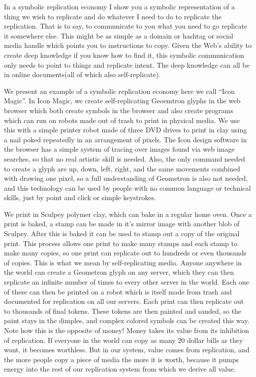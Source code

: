 In a symbolic replication economy I show you a symbolic representation
of a thing we wish to replicate and do whatever I need to do to
replicate the replication. That is to say, to communicate to you what
you need to go replicate it somewhere else. This might be as simple as a
domain or hashtag or social media handle which points you to
instructions to copy. Given the Web's ability to create deep knowledge
if you know how to find it, this symbolic communication only needs to
point to things and replicate intent. The deep knowledge can all be in
online documents(all of which also self-replicate).

We present an example of a symbolic replication economy here we call
``Icon Magic''. In Icon Magic, we create self-replicating Geoemtron
glyphs in the web browser which both create symbols in the browser and
also create programs which can run on robots made out of trash to print
in physical media. We use this with a simple printer robot made of three
DVD drives to print in clay using a nail poked repeatedly in an
arrangement of pixels. The Icon design software in the browser has a
simple system of tracing over images found via web image searches, so
that no real artistic skill is needed. Also, the only command needed to
create a glyph are up, down, left, right, and the same movements
combined with drawing one pixel, so a full understanding of Geometron is
also not needed, and this technology can be used by people with no
common language or technical skills, just by point and click or simple
keystrokes.

We print in Sculpey polymer clay, which can bake in a regular home oven.
Once a print is baked, a stamp can be made in it's mirror image with
another blob of Sculpey. After this is baked it can be used to stamp out
a copy of the original print. This process allows one print to make many
stamps and each stamp to make many copies, so one print can replicate
out to hundreds or even thousands of copies. This is what we mean by
self-replicating media. Anyone anywhere in the world can create a
Geometron glyph on any server, which they can then replicate an infinite
number of times to every other server in the world. Each one of these
can then be printed on a robot which is itself made from trash and
documented for replication on all our servers. Each print can then
replicate out to thousands of final tokens. These tokens are then
painted and sanded, so the paint stays in the dimples, and complex
colored symbols can be created this way. Note how this is the opposite
of money! Money takes its value from its inhibition of replication. If
everyone in the world can copy as many 20 dollar bills as they want, it
becomes worthless. But in our system, value comes from replication, and
the more people copy a piece of media the more it is worth, because it
pumps energy into the rest of our replication system from which we
derive all value.


